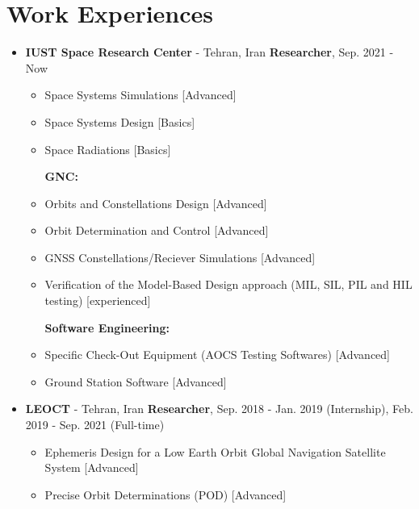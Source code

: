 \documentclass[11pt,a4paper, sans]{moderncv}
\begin{document}
\section{Work Experiences}
\begin{itemize}
	\item \textbf{IUST Space Research Center} - Tehran, Iran \hfill \textbf{Researcher}, Sep. 2021 - Now \vspace{6 pt}
	\begin{itemize}
	\textbf{Space Mission Engineering:}	
	\item Space Systems Simulations [Advanced]
	\item Space Systems Design [Basics]
	\item Space Radiations [Basics] \vspace{6 pt}
	
	\textbf{GNC:}	
	\item Orbits and Constellations Design [Advanced] 
	\item Orbit Determination and Control [Advanced]
	\item GNSS Constellations/Reciever Simulations [Advanced]
	\item Verification of the Model-Based Design approach (MIL, SIL, PIL and HIL testing) [experienced] \vspace{6 pt}
	
	\textbf{Software Engineering:}	
	\item Specific Check-Out Equipment (AOCS Testing Softwares) [Advanced]
	\item Ground Station Software [Advanced] \vspace{6 pt}
	\end{itemize} 
	\item \textbf{LEOCT} - Tehran, Iran \hfill \textbf{Researcher}, Sep. 2018 - Jan. 2019 (Internship), Feb. 2019 - Sep. 2021 (Full-time) \vspace{6 pt}
	\begin{itemize}
	\item Ephemeris Design for a Low Earth Orbit Global Navigation Satellite System [Advanced]
	\item Precise Orbit Determinations (POD) [Advanced]
	\end{itemize}
\end{itemize}
\end{document}
